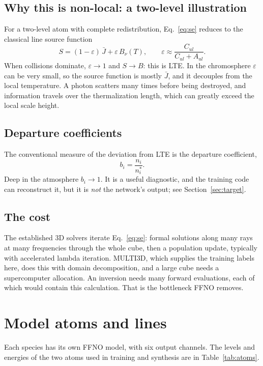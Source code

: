 \subsection{Why this is non-local: a two-level illustration}
For a two-level atom with complete redistribution, Eq.~\eqref{eq:se} reduces to the classical line source function
\begin{equation}
S=(1-\varepsilon)\,\bar J+\varepsilon\,B_\nu(T),\qquad \varepsilon\approx\frac{C_{ul}}{C_{ul}+A_{ul}} .
\end{equation}
When collisions dominate, $\varepsilon\to1$ and $S\to B$: this is LTE. In the chromosphere $\varepsilon$ can be very small, so the source function is mostly $\bar J$, and it decouples from the local temperature. A photon scatters many times before being destroyed, and information travels over the thermalization length, which can greatly exceed the local scale height.

\subsection{Departure coefficients}
The conventional measure of the deviation from LTE is the departure coefficient,
\begin{equation}
b_i=\frac{n_i}{n_i^*}.
\end{equation}
Deep in the atmosphere $b_i\to1$. It is a useful diagnostic, and the training code can reconstruct it, but it is \emph{not} the network's output; see Section~\ref{sec:target}.

\subsection{The cost}
The established 3D solvers iterate Eq.~\eqref{eq:se}: formal solutions along many rays at many frequencies through the whole cube, then a population update, typically with accelerated lambda iteration. MULTI3D, which supplies the training labels here, does this with domain decomposition, and a large cube needs a supercomputer allocation. An inversion needs many forward evaluations, each of which would contain this calculation. That is the bottleneck FFNO removes.

\section{Model atoms and lines}

Each species has its own FFNO model, with six output channels. The levels and energies of the two atoms used in training and synthesis are in Table~\ref{tab:atoms}.

